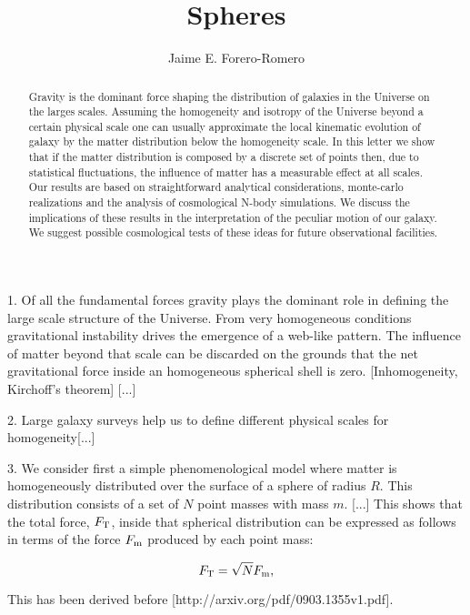 \documentclass{article}
\title{Spheres}
\author{Jaime E. Forero-Romero}
\begin{document}
\maketitle
\begin{abstract}

Gravity is the dominant force shaping the distribution of galaxies in
the Universe on the larges scales. Assuming the homogeneity and
isotropy of the Universe beyond a certain physical scale one can
usually approximate the local kinematic evolution of galaxy by the
matter distribution below the homogeneity scale. In this letter we
show that if the matter distribution is composed by a discrete set of
points then, due to statistical fluctuations, the influence of matter
has a measurable effect at all scales. Our results are based on
straightforward analytical considerations, monte-carlo realizations
and the analysis of cosmological N-body simulations. We discuss the
implications of these results in the interpretation of the peculiar
motion of our galaxy. We suggest possible cosmological tests of these
ideas for future observational facilities.



\end{abstract}

1. Of all the fundamental forces gravity plays the dominant role in
defining the large scale structure of the Universe. From very
homogeneous conditions gravitational instability drives the emergence
of a web-like pattern. The influence of
matter beyond that scale can be discarded on the grounds that
the net gravitational force inside an homogeneous spherical
shell is zero. [Inhomogeneity, Kirchoff's theorem] [...]



2. Large galaxy surveys help us to define different physical scales for
homogeneity[...]


3. We consider first a simple phenomenological model where matter is
homogeneously distributed over the surface of a sphere of radius
$R$. This distribution consists of a set of $N$ point masses with mass
$m$. [...] This shows that the total force, $F_{\rm T}$, inside that spherical
distribution can be expressed as follows in terms of the force $F_{\rm
m}$ produced by each point mass:

\begin{equation}
F_{\rm T } = \sqrt{N} F_{\rm m},
\end{equation}

This has been derived before [http://arxiv.org/pdf/0903.1355v1.pdf].
\end{document}
